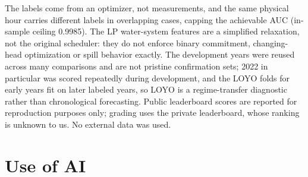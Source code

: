 \documentclass{article}
\begin{document}
The labels come from an optimizer, not measurements, and the same
physical hour carries different labels in overlapping cases, capping the
achievable AUC (in-sample ceiling 0.9985). The LP water-system features
are a simplified relaxation, not the original scheduler: they do not
enforce binary commitment, changing-head optimization or spill behavior
exactly. The development years were reused across many comparisons and
are not pristine confirmation sets; 2022 in particular was scored
repeatedly during development, and the LOYO folds for early years fit on
later labeled years, so LOYO is a regime-transfer diagnostic rather than
chronological forecasting. Public leaderboard scores are reported for
reproduction purposes only; grading uses the private leaderboard, whose
ranking is unknown to us. No external data was used.

\section{Use of AI}



\end{document}
